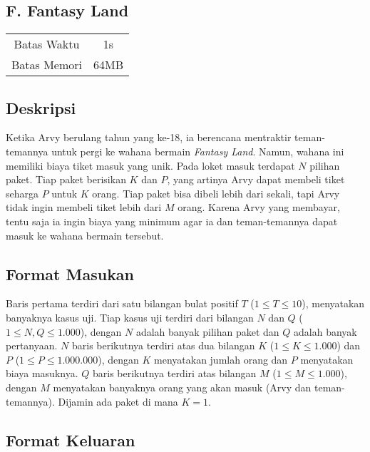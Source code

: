 \documentclass{article}
\begin{document}
\begin{center}
    \section*{F. Fantasy Land} %

    \begin{tabular}{ | c c | }
        \hline
        Batas Waktu  & 1s \\    %
        Batas Memori & 64MB \\  %
        \hline
    \end{tabular}
\end{center}

\subsection*{Deskripsi}

Ketika Arvy berulang tahun yang ke-18, ia berencana mentraktir teman-temannya untuk pergi ke wahana bermain \textit{Fantasy Land}.
Namun, wahana ini memiliki biaya tiket masuk yang unik.
Pada loket masuk terdapat $N$ pilihan paket.
Tiap paket berisikan $K$ dan $P$, yang artinya Arvy dapat membeli tiket seharga $P$ untuk $K$ orang.
Tiap paket bisa dibeli lebih dari sekali, tapi Arvy tidak ingin membeli tiket lebih dari $M$ orang.
Karena Arvy yang membayar, tentu saja ia ingin biaya yang minimum agar ia dan teman-temannya dapat masuk ke wahana bermain tersebut.


\subsection*{Format Masukan}

Baris pertama terdiri dari satu bilangan bulat positif $T$ ($1 \leq T \leq 10$), menyatakan banyaknya kasus uji.
Tiap kasus uji terdiri dari bilangan $N$ dan $Q$ ($1 \leq N, Q \leq 1.000$), dengan $N$ adalah banyak pilihan paket dan $Q$ adalah banyak pertanyaan.
$N$ baris berikutnya terdiri atas dua bilangan $K$ ($1 \leq K \leq 1.000$) dan $P$ ($1 \leq P \leq 1.000.000$), dengan $K$ menyatakan jumlah orang dan $P$ menyatakan biaya masuknya.
$Q$ baris berikutnya terdiri atas bilangan $M$ ($1 \leq M \leq 1.000$), dengan $M$ menyatakan banyaknya orang yang akan masuk (Arvy dan teman-temannya).
Dijamin ada paket di mana $K = 1$.

\subsection*{Format Keluaran}
\end{document}
